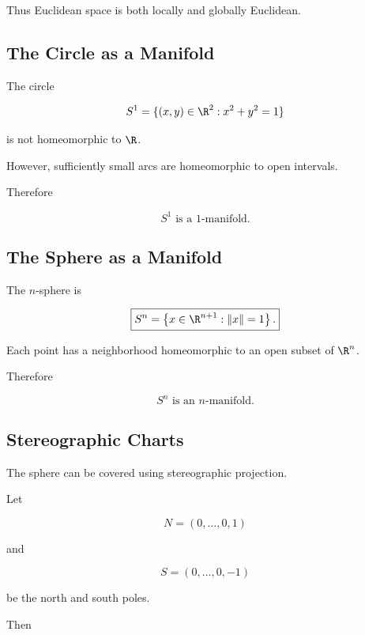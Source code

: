 Thus Euclidean space is both locally and globally Euclidean.

\subsection{The Circle as a Manifold}
\label{subsec:circle-manifold}

The circle

\[
S^1
=
\{(x,y)\in\R^2:x^2+y^2=1\}
\]

is not homeomorphic to \(\R\).

However, sufficiently small arcs are homeomorphic to open intervals.

Therefore

\[
\boxed{
S^1
\text{ is a }1\text{-manifold}.
}
\]

\subsection{The Sphere as a Manifold}
\label{subsec:sphere-manifold}

The \(n\)-sphere is

\[
\boxed{
S^n
=
\left\{
x\in\R^{n+1}:
\|x\|=1
\right\}.
}
\]

Each point has a neighborhood homeomorphic to an open subset of \(\R^n\).

Therefore

\[
\boxed{
S^n
\text{ is an }n\text{-manifold}.
}
\]

\subsection{Stereographic Charts}
\label{subsec:stereographic-charts-manifolds}

The sphere can be covered using stereographic projection.

Let

\[
N=(0,\ldots,0,1)
\]

and

\[
S=(0,\ldots,0,-1)
\]

be the north and south poles.

Then

